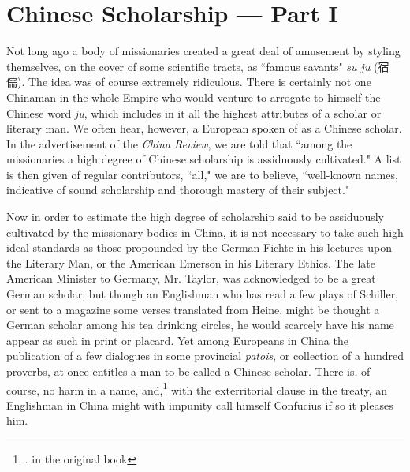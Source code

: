 \chapter{Chinese Scholarship --- Part I}
Not long ago a body of missionaries created a great deal of amusement by styling themselves, on the cover of some scientific tracts, as ``famous savants" \emph{su ju} (宿儒).
The idea was of course extremely ridiculous.
There is certainly not one Chinaman in the whole Empire who would venture to arrogate to himself the Chinese word \emph{ju}, which includes in it all the highest attributes of a scholar or literary man.
We often hear, however, a European spoken of as a Chinese scholar.
In the advertisement of the \emph{China Review}, we are told that ``among the missionaries a high degree of Chinese scholarship is assiduously cultivated."
A list is then given of regular contributors, ``all," we are to believe, ``well-known names, indicative of sound scholarship and thorough mastery of their subject."

Now in order to estimate the high degree of scholarship said to be assiduously cultivated by the missionary bodies in China, it is not necessary to take such high ideal standards as those propounded by the German Fichte in his lectures upon the Literary Man, or the American Emerson in his Literary Ethics.
The late American Minister to Germany, Mr. Taylor, was acknowledged to be a great German scholar; but though an Englishman who has read a few plays of Schiller, or sent to a magazine some verses translated from Heine, might be thought a German scholar among his tea drinking circles, he would scarcely have his name appear as such in print or placard.
Yet among Europeans in China the publication of a few dialogues in some provincial \emph{patois}, or collection of a hundred proverbs, at once entitles a man to be called a Chinese scholar.
There is, of course, no harm in a name, and,\footnote{. in the original book} with the exterritorial clause in the treaty, an Englishman in China might with impunity call himself Confucius if so it pleases him.

